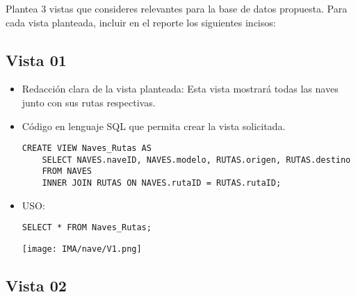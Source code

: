 Plantea 3 vistas que consideres relevantes para la base de datos propuesta. Para cada vista planteada, incluir en el reporte los siguientes incisos:

\subsection*{Vista 01}

\begin{itemize}
    \item Redacción clara de la vista planteada: Esta vista mostrará todas las naves junto con sus rutas respectivas.
    \item Código en lenguaje SQL que permita crear la vista solicitada.
    
    \begin{lstlisting}[caption={Tablas para la BdDatos}, label={lst:sql_estadios}]
    CREATE VIEW Naves_Rutas AS
    SELECT NAVES.naveID, NAVES.modelo, RUTAS.origen, RUTAS.destino
    FROM NAVES
    INNER JOIN RUTAS ON NAVES.rutaID = RUTAS.rutaID;
    \end{lstlisting}    
    
    \item USO:
    
    \begin{lstlisting}[caption={Tablas para la BdDatos}, label={lst:sql_estadios}]
    SELECT * FROM Naves_Rutas;
    \end{lstlisting}    

    \begin{center}
      \texttt{[image: IMA/nave/V1.png]}
    \end{center}
\end{itemize}


\subsection*{Vista 02}

